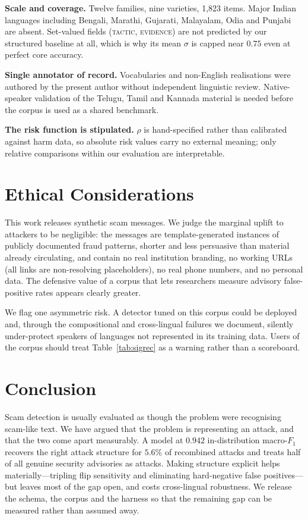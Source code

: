 \documentclass[11pt,a4paper]{article}
\newcommand{\sig}{\ensuremath{\sigma}}
\begin{document}
\textbf{Scale and coverage.} Twelve families, nine varieties, 1{,}823 items.
Major Indian languages including Bengali, Marathi, Gujarati, Malayalam, Odia and
Punjabi are absent. Set-valued fields (\textsc{tactic}, \textsc{evidence}) are
not predicted by our structured baseline at all, which is why its mean \sig{}
is capped near $0.75$ even at perfect core accuracy.

\textbf{Single annotator of record.} Vocabularies and non-English realisations
were authored by the present author without independent linguistic review.
Native-speaker validation of the Telugu, Tamil and Kannada material is needed
before the corpus is used as a shared benchmark.

\textbf{The risk function is stipulated.} $\rho$ is hand-specified rather than
calibrated against harm data, so absolute risk values carry no external meaning;
only relative comparisons within our evaluation are interpretable.

\section{Ethical Considerations}

This work releases synthetic scam messages. We judge the marginal uplift to
attackers to be negligible: the messages are template-generated instances of
publicly documented fraud patterns, shorter and less persuasive than material
already circulating, and contain no real institution branding, no working URLs
(all links are non-resolving placeholders), no real phone numbers, and no
personal data. The defensive value of a corpus that lets researchers measure
advisory false-positive rates appears clearly greater.

We flag one asymmetric risk. A detector tuned on this corpus could be deployed
and, through the compositional and cross-lingual failures we document, silently
under-protect speakers of languages not represented in its training data. Users
of the corpus should treat Table~\ref{tab:sigrec} as a warning rather than a
scoreboard.

\section{Conclusion}

Scam detection is usually evaluated as though the problem were recognising
scam-like text. We have argued that the problem is representing an attack, and
that the two come apart measurably. A model at $0.942$ in-distribution macro-$F_1$
recovers the right attack structure for $5.6\%$ of recombined attacks and treats
half of all genuine security advisories as attacks. Making structure explicit
helps materially---tripling flip sensitivity and eliminating hard-negative false
positives---but leaves most of the gap open, and costs cross-lingual robustness.
We release the schema, the corpus and the harness so that the remaining gap can
be measured rather than assumed away.
\end{document}
